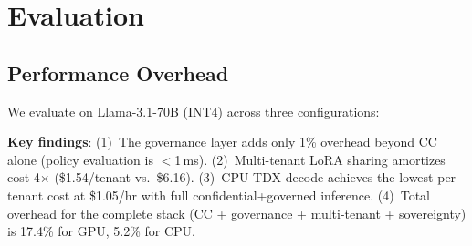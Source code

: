 \documentclass[conference,10pt]{IEEEtran}
\begin{document}
\section{Evaluation}
\label{sec:eval}

\subsection{Performance Overhead}

We evaluate on Llama-3.1-70B (INT4) across three configurations:

\begin{table}[!htbp]
\caption{End-to-End Performance: Confidential + Governed Inference}
\label{tab:e2e}
\centering\scriptsize
{}
\end{table}

\textbf{Key findings}: (1)~The governance layer adds only 1\% overhead beyond CC alone (policy evaluation is $<$1\,ms). (2)~Multi-tenant LoRA sharing amortizes cost 4$\times$ (\$1.54/tenant vs.\ \$6.16). (3)~CPU TDX decode achieves the lowest per-tenant cost at \$1.05/hr with full confidential+governed inference. (4)~Total overhead for the complete stack (CC + governance + multi-tenant + sovereignty) is 17.4\% for GPU, 5.2\% for CPU.
\end{document}
